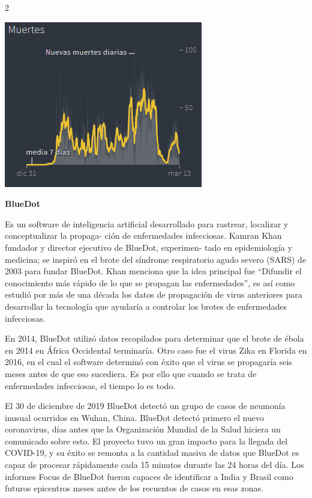 \documentclass[12pt,spanish,Letterpaper,openany]{book}
\begin{document}
\begin {multicols}{2}
\begin {flushleft}
\begin{minipage}[c]{\columnwidth}
\includegraphics[width=1\linewidth]{images/pareja24_image2}

\end{minipage}
\end {flushleft}

\textbf{BlueDot}

Es un software de inteligencia artificial desarrollado para rastrear, localizar y conceptualizar la propaga-
ción de enfermedades infecciosas. Kamran Khan fundador y director ejecutivo de BlueDot, experimen-
tado en epidemiología y medicina; se inspiró en el brote del síndrome respiratorio agudo severo (SARS) de 2003 para fundar BlueDot. Khan menciona que la idea principal fue ``Difundir el conocimiento más rápido de lo que se propagan las enfermedades'', es así como estudió por más de una década los datos de propagación de virus anteriores para desarrollar la tecnología que ayudaría a controlar los brotes de enfermedades infecciosas.

En 2014, BlueDot utilizó datos recopilados para determinar que el brote de ébola en 2014 en África Occidental terminaría. Otro caso fue el virus Zika en Florida en 2016, en el cual el software determinó con éxito que el virus se propagaría seis meses antes de que eso sucediera. Es por ello que cuando se trata de enfermedades infecciosas, el tiempo lo es todo.

El 30 de diciembre de 2019 BlueDot detectó un grupo de casos de neumonía inusual ocurridos en Wuhan, China. BlueDot detectó primero el nuevo coronavirus, días antes que la Organización Mundial de la Salud hiciera un comunicado sobre esto. El proyecto tuvo un gran impacto para la llegada del COVID-19, y su éxito se remonta a la cantidad masiva de datos que BlueDot es capaz de procesar rápidamente cada 15 minutos durante las 24 horas del día. Los informes Focus de BlueDot fueron capaces de identificar a India y Brasil como futuros epicentros meses antes de los recuentos de casos en esas zonas.


\end{multicols}
\end{document}
